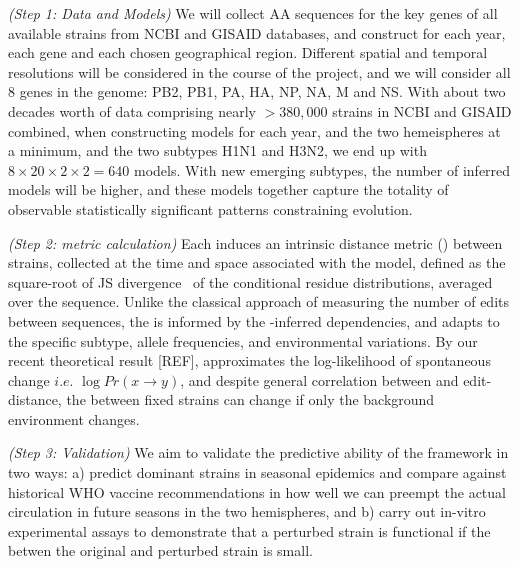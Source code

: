 \documentclass[onecolumn, compsoc,12pt]{IEEEtran}
\begin{document}
\textit{(Step 1: Data and \enet Models)} We will collect AA sequences for the key genes of all available strains from NCBI and GISAID databases, and construct  for each year,  each gene and each chosen geographical region. Different spatial and temporal resolutions will be considered in the course of the project, and we will consider all 8 genes in the \infl genome: PB2, PB1, PA, HA, NP, NA, M and NS. With about two decades worth of data comprising nearly $>380,000$ strains in NCBI and GISAID combined, when constructing models for each year, and the two hemeispheres at a minimum, and the two subtypes H1N1 and H3N2, we end up with  $ 8 \times 20 \times 2 \times 2 = 640$ \enet models. With new emerging subtypes, the number of inferred models will be higher, and these models together capture the totality of observable statistically significant patterns constraining \infl evolution. 

\textit{(Step 2: \qdist metric calculation)} Each  \enet induces  an intrinsic distance metric (\qdist) between strains, collected at the time and space associated with the model, defined as the square-root of JS  divergence~\cite{cover} of the conditional residue distributions, averaged over the sequence. Unlike the classical approach of measuring the number of edits between sequences, the \qdist is informed by the \enet-inferred  dependencies, and adapts to the specific subtype, allele frequencies, and environmental variations. By our recent theoretical result [REF],  \qdist  approximates the log-likelihood of spontaneous change $i.e.$ $\log Pr(x \rightarrow y )$, and despite general correlation between \qdist and edit-distance, the \qdist between fixed strains can change if only the background environment changes. 

\textit{(Step 3: Validation)} We aim to validate the predictive ability of the \enet framework in two ways: a) predict dominant strains in seasonal epidemics and compare against historical WHO vaccine recommendations in how well we can preempt the actual circulation in future seasons in the two hemispheres, and b) carry out in-vitro experimental assays to demonstrate that a perturbed strain is functional if the \qdist betwen the original and perturbed strain is small. 
\end{document}
